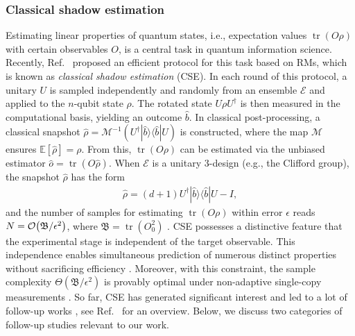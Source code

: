 \documentclass[aps,prl,twocolumn,nofootinbib,superscriptaddress,10pt]{revtex4-2}
\let\originalleft\left
\let\originalright\right
\renewcommand{\left}{\mathopen{}\mathclose\bgroup\originalleft}
\renewcommand{\right}{\aftergroup\egroup\originalright}
\def\>{\rangle}
\def\<{\langle}
\DeclareMathOperator{\Tr}{tr}
\newcommand{\bigo}[1]{\mathcal{O}\left(#1\right)}
\theoremstyle{plain}
\theoremstyle{definition}
\begin{document}
\subsubsection{Classical shadow estimation}
Estimating linear properties of quantum states, i.e., expectation values $\Tr(O\rho)$ with certain observables $O$, is a central task in quantum information science. 
Recently, Ref.~\cite{HKPshadow20} proposed an efficient protocol for this task based on RMs, which is known as \emph{classical shadow estimation} (CSE). 
In each round of this protocol, a unitary $U$ is sampled independently and randomly from an ensemble $\mathcal E$ and applied to the $n$-qubit state $\rho$. The rotated state $U\rho U^{\dag}$ is then measured in the computational basis, yielding an outcome $\hat b$. 
In classical post-processing, 
a classical snapshot \(\hat{\rho} = \mathcal{M}^{-1}(U^\dagger |\hat{b}\rangle\langle\hat{b}| U)\) is constructed, where the map \(\mathcal{M}\) ensures \(\mathbb{E}[\hat{\rho}] = \rho\). From this, \(\Tr(O\rho)\) can be estimated via the unbiased estimator \(\hat{o} = \Tr(O\hat{\rho})\).  
When $\mathcal E$ is a unitary 3-design (e.g., the Clifford group), the snapshot $\hat\rho$ has the form 
\begin{align}
\hat\rho
= (d+1) U^{\dag}|\hat b\>\<\hat b| U -I , 
\end{align} 
and the number of samples for estimating $\Tr(O\rho)$ within error $\epsilon$ reads $N=\bigo{\mathfrak{B}/\epsilon^2}$, where $\mathfrak{B}=\Tr(O_0^2)$ \cite{HKPshadow20}. 
CSE possesses a distinctive feature that  the experimental stage is independent of the target observable. 
This independence enables simultaneous prediction of numerous distinct properties without sacrificing efficiency \cite{elben2023randomized,HKPshadow20}. Moreover, with this constraint, the sample complexity $\Theta(\mathfrak{B}/\epsilon^2)$ is provably optimal under non-adaptive single-copy measurements \cite{HKPshadow20}. 
So far, 
CSE has generated significant interest and led to a lot of follow-up works \cite{PhysRevLett.133.020602,Grier22,PhysRevResearch.5.023027,PRXQuantum.5.010352,PhysRevLett.131.240602,Zhou2023perform,arienzo2023closed,zhang2024minimal,zhou2024hybrid,liu2024auxiliary,Akhtar2023scalableflexible,PhysRevLett.130.230403,schuster2025random}, see Ref.~\cite{elben2023randomized} for an overview.
Below, we discuss two categories of follow-up studies relevant to our work. 
\end{document}
